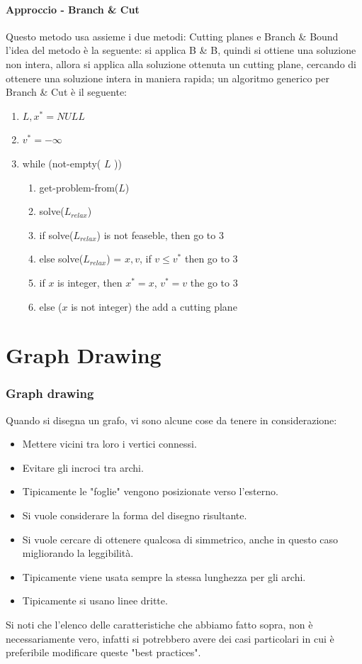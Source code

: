 \documentclass[12pt,a4paper]{article}
\begin{document}
\subsection{Approccio - Branch \& Cut}
Questo metodo usa assieme i due metodi: Cutting planes e Branch \& Bound l'idea del metodo è la seguente: si applica B \& B, quindi si ottiene una soluzione non intera, allora si applica alla soluzione ottenuta un cutting plane, cercando di ottenere una soluzione intera in maniera rapida; un algoritmo generico per Branch \& Cut è il seguente:
\begin{enumerate}
\item $L, x^{*} = NULL$
\item $v^{*} = - \infty $
\item while (not-empty( $L$ ))
\begin{enumerate}
\item get-problem-from($L$)
\item solve($L_{relax}$)
\item if solve($L_{relax}$) is not feaseble, then go to $3$
\item else solve($L_{relax}$) = $x, v$, if $v \leq v^*$ then go to $3$
\item if $x$ is integer, then $x^* = x$, $v^* = v$ the go to $3$
\item else ($x$ is not integer) the add a cutting plane
\end{enumerate}
\end{enumerate}

\pagebreak
\part{Graph Drawing}

\section{Graph drawing}
Quando si disegna un grafo, vi sono alcune cose da tenere in considerazione:
\begin{itemize}
\item Mettere vicini tra loro i vertici connessi.
\item Evitare gli incroci tra archi.
\item Tipicamente le "foglie" vengono posizionate verso l'esterno.
\item Si vuole considerare la forma del disegno risultante.
\item Si vuole cercare di ottenere qualcosa di simmetrico, anche in questo caso migliorando la leggibilità.
\item Tipicamente viene usata sempre la stessa lunghezza per gli archi.
\item Tipicamente si usano linee dritte.
\end{itemize}
Si noti che l'elenco delle caratteristiche che abbiamo fatto sopra, non è necessariamente vero, infatti si potrebbero avere dei casi particolari in cui è preferibile modificare queste "best practices".
\end{document}
